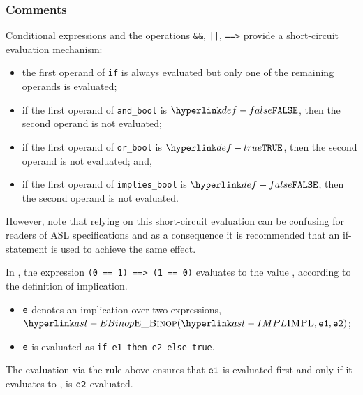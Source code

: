 \subsubsection{Comments}

Conditional expressions and the operations \texttt{\&\&}, \texttt{||},
\texttt{==>} provide a short-circuit evaluation mechanism:

\begin{itemize}
\item the first operand of \texttt{if} is always evaluated but only one of the
remaining operands is evaluated;
\item if the first operand of \texttt{and\_bool} is $\False$, then the second operand is not evaluated;
\item if the first operand of \texttt{or\_bool} is $\True$, then the second operand is not evaluated; and,
\item if the first operand of \texttt{implies\_bool} is $\False$, then the
second operand is not evaluated.
\end{itemize}

However, note that relying on this short-circuit evaluation can be confusing
for readers of ASL specifications and as a consequence it is recommended that
an if-statement is used to achieve the same effect.

In ,
the expression \texttt{(0 == 1) ==> (1 == 0)} evaluates to the value \True, according to the definition of implication.

\ProseParagraph
\AllApply
\begin{itemize}
  \item $\ve$ denotes an implication over two expressions, $\EBinop(\IMPL, \veone, \vetwo)$;
  \item $\ve$ is evaluated as \texttt{if e1 then e2 else true}.
\end{itemize}

\FormallyParagraph
\begin{mathpar}
\end{mathpar}
The evaluation via the rule above ensures that $\veone$ is evaluated first and only if
it evaluates to \True, is $\vetwo$ evaluated.

